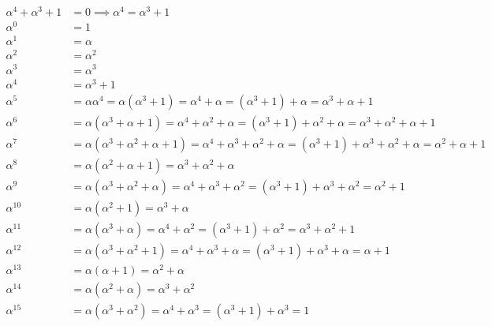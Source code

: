 \documentclass[11pt,fleqn]{article}
\begin{document}
\begin{enumerate}[label=\alph*)]
\begin{align*}
\alpha^4+\alpha^3+1&=0\implies\alpha^4=\alpha^3+1\\
\alpha^0 &= 1\\
\alpha^1 &= \alpha\\
\alpha^2 &= \alpha^2\\
\alpha^3 &= \alpha^3\\
\alpha^4 &= \alpha^3+1\\
\alpha^5 &= \alpha\alpha^4=\alpha(\alpha^3+1)=\alpha^4+\alpha=(\alpha^3+1)+\alpha=\alpha^3+\alpha+1\\
\alpha^6 &= \alpha(\alpha^3+\alpha+1)=\alpha^4+\alpha^2+\alpha=(\alpha^3+1)+\alpha^2+\alpha=\alpha^3+\alpha^2+\alpha+1\\
\alpha^7 &= \alpha(\alpha^3+\alpha^2+\alpha+1)=\alpha^4+\alpha^3+\alpha^2+\alpha=(\alpha^3+1)+\alpha^3+\alpha^2+\alpha=\alpha^2+\alpha+1\\
\alpha^8 &= \alpha(\alpha^2+\alpha+1)=\alpha^3+\alpha^2+\alpha\\
\alpha^9 &= \alpha(\alpha^3+\alpha^2+\alpha)= \alpha^4+\alpha^3+\alpha^2= (\alpha^3+1)+\alpha^3+\alpha^2= \alpha^2+1\\
\alpha^{10} &= \alpha(\alpha^2+1)= \alpha^3+\alpha\\
\alpha^{11} &= \alpha(\alpha^3+\alpha)= \alpha^4+\alpha^2= (\alpha^3+1)+\alpha^2= \alpha^3+\alpha^2+1\\
\alpha^{12} &= \alpha(\alpha^3+\alpha^2+1)= \alpha^4+\alpha^3+\alpha= (\alpha^3+1)+\alpha^3+\alpha= \alpha+1\\
\alpha^{13} &= \alpha(\alpha+1)= \alpha^2+\alpha\\
\alpha^{14} &= \alpha(\alpha^2+\alpha)= \alpha^3+\alpha^2\\
\alpha^{15} &= \alpha(\alpha^3+\alpha^2)= \alpha^4+\alpha^3= (\alpha^3+1)+\alpha^3= 1
\end{align*}

\end{enumerate}
\end{document}
